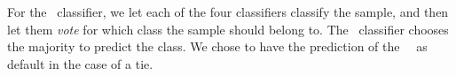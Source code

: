 For the \hy\ classifier, we let each of the four classifiers classify the sample, and then let them \emph{vote} for which class the sample should belong to. The \hy\ classifier chooses the majority to predict the class. We chose to have the prediction of the \mn\ \nb\ as default in the case of a tie.